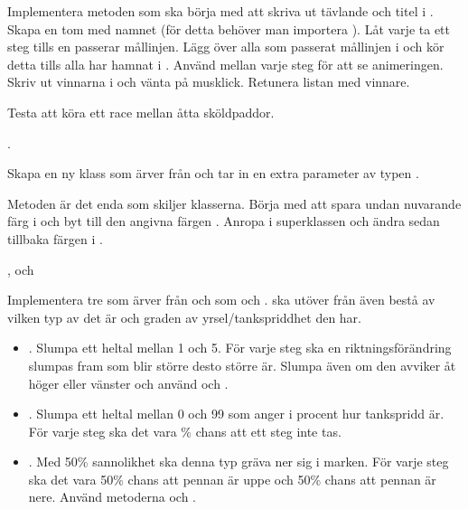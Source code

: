 \Task {}

\Subtask Implementera metoden  som ska börja med att skriva ut tävlande och titel i . Skapa en tom  med namnet  (för detta behöver man importera ). Låt varje  ta ett steg tills en passerar mållinjen. Lägg över alla som passerat mållinjen i  och kör detta tills alla  har hamnat i . Använd  mellan varje steg för att se animeringen. Skriv ut vinnarna i  och vänta på musklick. Retunera listan med vinnare.

\Subtask Testa att köra ett race mellan åtta sköldpaddor.

\Task {}.

\Subtask Skapa en ny klass  som ärver från  och tar in en extra parameter  av typen .

\Subtask Metoden  är det enda som skiljer klasserna. Börja med att spara undan nuvarande färg i  och byt till den angivna färgen . Anropa  i superklassen och ändra sedan tillbaka färgen i .

\Task {},  och 

\Subtask Implementera tre  som ärver från  och som   och .  ska utöver  från  även bestå av vilken typ av  det är och graden av yrsel/tankspriddhet den har.

\begin{itemize}

\item {}. Slumpa ett heltal  mellan 1 och 5. För varje steg ska en riktningsförändring slumpas fram som blir större desto större  är. Slumpa även om den avviker åt höger eller vänster och använd  och .

\item {}. Slumpa ett heltal  mellan 0 och 99 som anger i procent hur tankspridd  är. För varje steg ska det vara \% chans att ett steg inte tas.

\item {}. Med 50\% sannolikhet ska denna typ  gräva ner sig i marken. För varje steg ska det vara 50\% chans att pennan är uppe och 50\% chans att pennan är nere. Använd metoderna  och .

\end{itemize}

